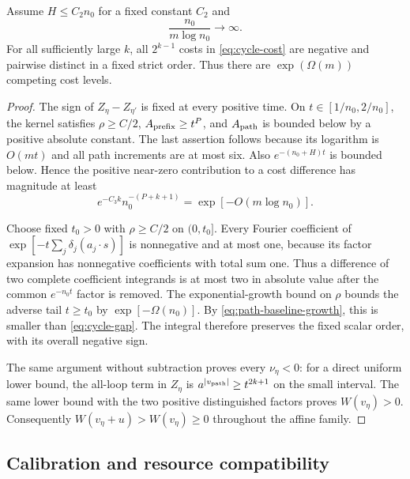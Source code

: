 \begin{theorem}
\label{thm:cycle-order}
Assume $H\le C_2n_0$ for a fixed constant $C_2$ and
\begin{equation}\label{eq:path-baseline-growth}
 \frac{n_0}{m\log n_0}\longrightarrow\infty.
\end{equation}
For all sufficiently large $k$, all $2^{k-1}$ costs in
\eqref{eq:cycle-cost} are negative and pairwise distinct in a fixed
strict order. Thus there are $\exp(\Omega(m))$ competing cost levels.
\end{theorem}
\begin{proof}
The sign of $Z_\eta-Z_{\eta'}$ is fixed at every positive time.
On $t\in[1/n_0,2/n_0]$, the kernel satisfies $\rho\ge C/2$,
$A_{\rm prefix}\ge t^P$, and $A_{\rm path}$ is bounded below by a
positive absolute constant. The last assertion follows because its
logarithm is $O(mt)$ and all path increments are at most six.
Also $e^{-(n_0+H)t}$ is bounded below. Hence the positive near-zero
contribution to a cost difference has magnitude at least
\begin{equation}\label{eq:cycle-gap}
 e^{-C_3k}n_0^{-(P+k+1)}=\exp[-O(m\log n_0)].
\end{equation}

Choose fixed $t_0>0$ with $\rho\ge C/2$ on $(0,t_0]$.
Every Fourier coefficient of
$\exp[-t\sum_j\delta_j(a_j\cdot s)]$ is nonnegative and at most
one, because its factor expansion has nonnegative coefficients with
total sum one. Thus a difference of two complete coefficient
integrands is at most two in absolute value after the common
$e^{-n_0t}$ factor is removed. The exponential-growth bound on
$\rho$ bounds the adverse tail $t\ge t_0$ by
$\exp[-\Omega(n_0)]$. By \eqref{eq:path-baseline-growth}, this is
smaller than \eqref{eq:cycle-gap}. The integral therefore preserves
the fixed scalar order, with its overall negative sign.

The same argument without subtraction proves every $\nu_\eta<0$:
for a direct uniform lower bound, the all-loop term in $Z_\eta$ is
$a^{|v_{\rm path}|}\ge t^{2k+1}$ on the small interval.
The same lower bound with the two positive distinguished factors
proves $W(v_\eta)>0$. Consequently
$W(v_\eta+u)>W(v_\eta)\ge0$ throughout the affine family.
\end{proof}

\subsection{Calibration and resource compatibility}

